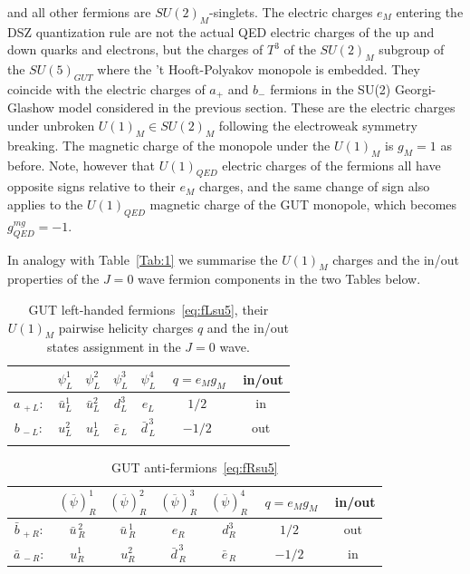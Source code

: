 \documentclass[a4paper,11pt]{article}
\begin{document}
and all other fermions are  $SU(2)_M$-singlets.
The electric charges $e_M$ entering the DSZ quantization rule are not the actual QED electric charges of the up and down quarks and electrons, but the 
charges of $T^3$ of the $SU(2)_M$ subgroup of the $SU(5)_{GUT}$ where the 't Hooft-Polyakov monopole is embedded. They coincide with the electric charges of $a_+$ and $b_-$ fermions in the SU(2) Georgi-Glashow model considered in the previous section. These are the electric charges under unbroken $U(1)_M \in SU(2)_M$ following the electroweak symmetry breaking. The magnetic charge of the monopole under the $U(1)_M$ is $g_M=1$ as before. Note, however that $U(1)_{QED}$ electric charges of the fermions all have opposite signs relative to their $e_M$ charges, and the same change of sign also applies to the $U(1)_{QED}$ magnetic charge of the GUT monopole, which becomes $g^{mg}_{QED} =-1$. 

\medskip

In analogy with Table~\ref{Tab:1} we summarise the $U(1)_M$ charges and the in/out properties of the $J=0$ wave fermion components in the two Tables below.

 \begin{table}[ht]
\centering
\begin{tabular}{c c c c c c c}
\hline\hline
 & $\psi_L^1$ & $\psi_L^2$ &$\psi_L^3$ &$\psi_L^4$ &$\,\,q=e_M g_M$ & \,\,in/out  \\ [0.5ex] 
\hline
$a_{\,+L}:$  & $\bar{u}^{1}_{L}$  &$\bar{u}^{2}_{L}$  &$d^{3}_{L} $ & $e_{L}$  & $1/2$ &{in} \\
$b_{\,-L}:$  & $u^{2}_{L}$  &$u^{1}_{L}$  &$\bar{e}_{\,L}$ & $\bar{d}^{\,3}_{\,L}$  &  $-1/2$ & {out} \\
[1ex]   
\hline\\
\end{tabular}
\caption{GUT left-handed fermions~\eqref{eq:fLsu5}, their $U(1)_M$ pairwise helicity charges $q$ and the in/out states assignment in the $J=0$ wave.}
\label{Tab:2}
\end{table}

\begin{table}[ht]
\centering
\begin{tabular}{c c c c c c c}
\hline\hline 
& $(\overline{\psi})_{R}^1$ &  $(\overline{\psi})_{R}^2$ & $(\overline{\psi})_{R}^3$ & $(\overline{\psi})_{R}^4$ &$\,\,q=e_M g_M$ & \,\,in/out \\ [0.5ex] 
\hline
 $\bar{b}_{\,+R}:$ & $\bar{u}^{\,2}_{\,R}$  &$\bar{u}^{\,1}_{\,R}$  &$e_{R}$ & $d^3_{R} $  & $1/2$ &out \\
$\bar{a}_{\,-R}:$  & $u^{1}_{R}$  &$u^{2}_{R}$  &$\bar{d}^{\,3}_{\,R}$ & $\bar{e}_{\,R}$  & $-1/2$ &in \\
[1ex]   
\end{tabular}
\caption{GUT anti-fermions~\eqref{eq:fRsu5}}
\label{Tab:3}
\end{table}
\end{document}
